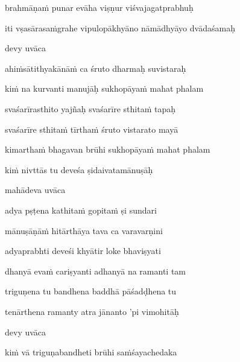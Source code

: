 brahmāṇaṁ punar evāha viṣṇur viśvajagatprabhuḥ \veg\dontdisplaylinenum


\jump
\begin{center}
\ketdanda iti vṣasārasaṁgrahe vipulopākhyāno nāmādhyāyo dvādaśamaḥ\ketdanda
\end{center}
\dontdisplaylinenum\vers 

\vers
{}
\bekveg\szamveg\vfill\phpspagebreak\szam\bek{}
\thispagestyle{empty}



\jump\jump 
devy uvāca~{\dandab}\dontdisplaylinenum 

ahiṁsātithyakānāṁ ca śruto dharmaḥ suvistaraḥ\thinspace{\danda} \dontdisplaylinenum

kiṁ na kurvanti manujāḥ sukhopāyaṁ mahat phalam \veg\dontdisplaylinenum

svaśarīrasthito yajñaḥ svaśarīre sthitaṁ tapaḥ\thinspace{\dandab} \dontdisplaylinenum

svaśarīre sthitaṁ tīrthaṁ śruto vistarato mayā \veg\dontdisplaylinenum

kimarthaṁ bhagavan brūhi sukhopāyaṁ mahat phalam\thinspace{\dandab} \dontdisplaylinenum

kiṁ nivttās tu deveśa ṣidaivatamānuṣāḥ \veg\dontdisplaylinenum

mahādeva uvāca~{\dandab}\dontdisplaylinenum 
{}

adya pṣṭena kathitaṁ gopitaṁ ṣi sundari\thinspace{\danda} \dontdisplaylinenum

mānuṣāṇāṁ hitārthāya tava ca varavarṇini \veg\dontdisplaylinenum

adyaprabhti deveśi khyātir loke bhaviṣyati\thinspace{\dandab} \dontdisplaylinenum

dhanyā evaṁ cariṣyanti adhanyā na ramanti tam \veg\dontdisplaylinenum

triguṇena tu bandhena baddhā pāśadḍhena tu\thinspace{\dandab} \dontdisplaylinenum

tenārthena ramanty atra jānanto 'pi vimohitāḥ \veg\dontdisplaylinenum

devy uvāca~{\dandab}\dontdisplaylinenum 

kiṁ vā triguṇabandheti brūhi saṁśayachedaka\thinspace{\danda} \dontdisplaylinenum

